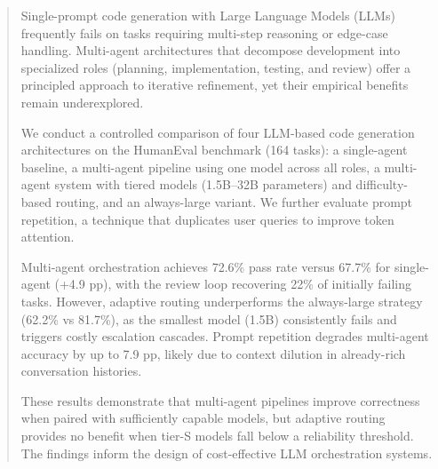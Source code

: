 \begin{abstract}

Single-prompt code generation with Large Language Models (LLMs) frequently fails on tasks requiring multi-step reasoning or edge-case handling. Multi-agent architectures that decompose development into specialized roles (planning, implementation, testing, and review) offer a principled approach to iterative refinement, yet their empirical benefits remain underexplored.

We conduct a controlled comparison of four LLM-based code generation architectures on the HumanEval benchmark (164 tasks): a single-agent baseline, a multi-agent pipeline using one model across all roles, a multi-agent system with tiered models (1.5B--32B parameters) and difficulty-based routing, and an always-large variant. We further evaluate prompt repetition, a technique that duplicates user queries to improve token attention.

Multi-agent orchestration achieves 72.6\% pass rate versus 67.7\% for single-agent (+4.9 pp), with the review loop recovering 22\% of initially failing tasks. However, adaptive routing underperforms the always-large strategy (62.2\% vs 81.7\%), as the smallest model (1.5B) consistently fails and triggers costly escalation cascades. Prompt repetition degrades multi-agent accuracy by up to 7.9 pp, likely due to context dilution in already-rich conversation histories.

These results demonstrate that multi-agent pipelines improve correctness when paired with sufficiently capable models, but adaptive routing provides no benefit when tier-S models fall below a reliability threshold. The findings inform the design of cost-effective LLM orchestration systems.

\end{abstract}

